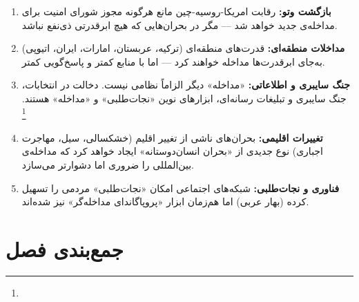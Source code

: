 \begin{tcolorbox}[defbox, title={روندهای آینده}]
\begin{enumerate}[nosep, label=\textbf{\arabic*.}]
  \item \textbf{بازگشت وتو:} رقابت امریکا-روسیه-چین مانع هرگونه مجوز شورای امنیت برای مداخله‌ی جدید خواهد شد — مگر در بحران‌هایی که هیچ ابرقدرتی ذی‌نفع نباشد.

  \item \textbf{مداخلات منطقه‌ای:} قدرت‌های منطقه‌ای (ترکیه، عربستان، امارات، ایران، اتیوپی) به‌جای ابرقدرت‌ها مداخله خواهند کرد — اما با منابع کمتر و پاسخ‌گویی کمتر.

  \item \textbf{جنگ سایبری و اطلاعاتی:} «مداخله» دیگر الزاماً نظامی نیست. دخالت در انتخابات، جنگ سایبری و تبلیغات رسانه‌ای، ابزارهای نوین «نجات‌طلبی» و «مداخله» هستند.%
  \footnote{}

  \item \textbf{تغییرات اقلیمی:} بحران‌های ناشی از تغییر اقلیم (خشکسالی، سیل، مهاجرت اجباری) نوع جدیدی از «بحران انسان‌دوستانه» ایجاد خواهد کرد که مداخله‌ی بین‌المللی را ضروری اما دشوارتر می‌سازد.

  \item \textbf{فناوری و نجات‌طلبی:} شبکه‌های اجتماعی امکان «نجات‌طلبی» مردمی را تسهیل کرده (بهار عربی) اما هم‌زمان ابزار «پروپاگاندای مداخله‌گر» نیز شده‌اند.
\end{enumerate}
\end{tcolorbox}

\section{جمع‌بندی فصل}
\label{sec:ch10-summary}

